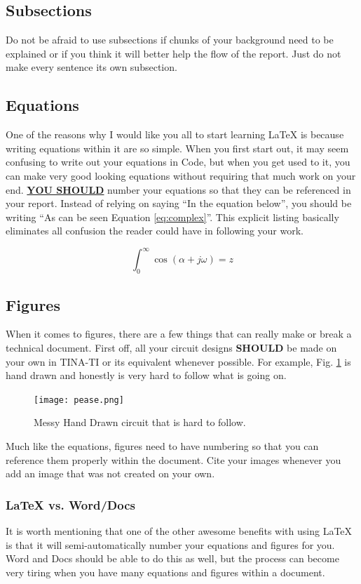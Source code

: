 \documentclass{hitec}
\begin{document}
\subsection{Subsections}
Do not be afraid to use subsections if chunks of your background need to be explained or if you think it will better help the flow of the report. Just do not make every sentence its own subsection.
\subsection{Equations}
One of the reasons why I would like you all to start learning LaTeX is because writing equations within it are so simple. When you first start out, it may seem confusing to write out your equations in Code, but when you get used to it, you can make very good looking equations without requiring that much work on your end. \textbf{\underline{YOU SHOULD}} number your equations so that they can be referenced in your report. Instead of relying on saying ``In the equation below'', you should be writing ``As can be seen Equation \ref{eq:complex}''. This explicit listing basically eliminates all confusion the reader could have in following your work.

\begin{equation}
\int_0^\infty \cos(\alpha + j\omega) = z
\label{eq:complex}
\end{equation}


\subsection{Figures}
When it comes to figures, there are a few things that can really make or break a technical document. First off, all your circuit designs \textbf{SHOULD} be made on your own in TINA-TI or its equivalent whenever possible. For example, Fig. \ref{fig:MessyCircuit} is hand drawn and honestly is very hard to follow what is going on.

\begin{figure}[h]
\centering
\texttt{[image: pease.png]}
\caption{Messy Hand Drawn circuit that is hard to follow.}
\label{fig:MessyCircuit}
\end{figure}

\noindent
Much like the equations, figures need to have numbering so that you can reference them properly within the document. Cite your images whenever you add an image that was not created on your own.

\subsubsection{\LaTeX \hspace{0ex} vs. Word/Docs}
It is worth mentioning that one of the other awesome benefits with using LaTeX is that it will semi-automatically number your equations and figures for you. Word and Docs should be able to do this as well, but the process can become very tiring when you have many equations and figures within a document. 
\end{document}
